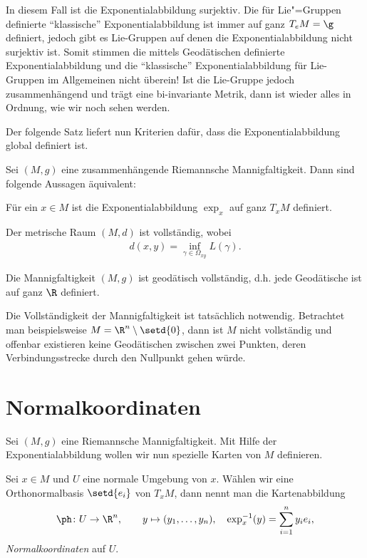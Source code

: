 \documentclass[%
	paper=a5,%
	fleqn,%
	DIV=18,%
	BCOR=0mm,
	fontsize=11pt,
	titlepage=false,%
	bibliography=totoc,
	DIV=18,%
	twoside=true,
	pdftitle=Riemannsche Geometrie,
	pdfauthor=Uwe Semmelmann,
	numbers=noendperiod]%
	{scrbook}
\begin{document}
\begin{rem}
In diesem Fall ist die Exponentialabbildung surjektiv. Die für Lie"=Gruppen definierte ``klassische'' Exponentialabbildung ist immer auf ganz $T_{e}M = \g$ definiert, jedoch gibt es Lie-Gruppen auf denen die Exponentialabbildung nicht surjektiv ist. Somit stimmen die mittels Geodätischen definierte Exponentialabbildung und die ``klassische'' Exponentialabbildung für Lie-Gruppen im Allgemeinen nicht überein! Ist die Lie-Gruppe jedoch zusammenhängend und trägt eine bi-invariante Metrik, dann ist wieder alles in Ordnung, wie wir noch sehen werden.\map 
\end{rem}

Der folgende Satz liefert nun Kriterien dafür, dass die Exponentialabbildung global definiert ist.

\begin{prop}
Sei $(M,g)$ eine zusammenhängende Riemannsche Mannigfaltigkeit. Dann sind folgende Aussagen äquivalent:
\begin{equivenum}
\item Für ein $x\in M$ ist die Exponentialabbildung $\exp_{x}$ auf ganz $T_{x}M$ definiert.
\item Der metrische Raum $(M,d)$ ist vollständig, wobei
\begin{align*}
d(x,y) = \inf_{\gamma\in\Omega_{xy}} L(\gamma).
\end{align*}
\item Die Mannigfaltigkeit $(M,g)$ ist geodätisch vollständig, d.h. jede Geodätische ist auf ganz $\R$ definiert.\fish
\end{equivenum}
\end{prop}

\begin{rem}
Die Vollständigkeit der Mannigfaltigkeit ist tatsächlich notwendig. Betrachtet man beispielsweise $M=\R^n\setminus\setd{0}$, dann ist $M$ nicht vollständig und offenbar existieren keine Geodätischen zwischen zwei Punkten, deren Verbindungsstrecke durch  den Nullpunkt gehen würde.\map
\end{rem}

\section{Normalkoordinaten}

Sei $(M,g)$ eine Riemannsche Mannigfaltigkeit. Mit Hilfe der
Exponentialabbildung wollen wir nun spezielle Karten von $M$ definieren.

\begin{defn}
Sei $x\in M$ und $U$ eine normale Umgebung von $x$. Wählen wir eine
Orthonormalbasis $\setd{e_i}$ von $T_xM$, dann nennt man die Kartenabbildung
\begin{align*}
\ph\colon U\to \R^n,\qquad
y \mapsto (y_1,\ldots,y_n),\quad \exp_x^{-1}(y) = \sum_{i=1}^n y_i e_i,
\end{align*}
\emph{Normalkoordinaten} auf $U$.\fish
\end{defn}
\end{document}
